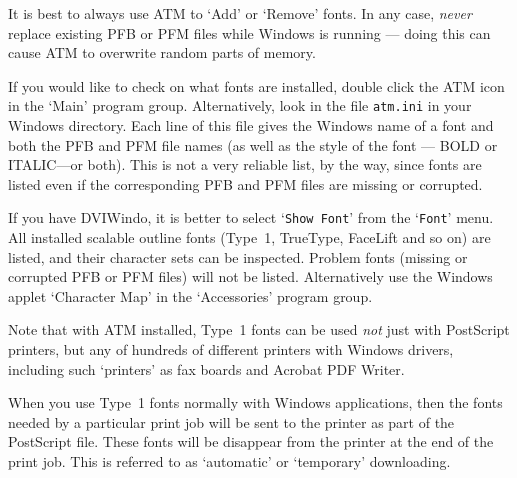 It is best to always use ATM to `Add' or `Remove' fonts.
%
In any case, {\it never} replace existing PFB or PFM files while Windows is
running --- doing this can cause ATM to overwrite random parts of memory.
%

If you would like to check on what fonts are installed, double
click the ATM icon in the `Main' program group.
Alternatively, look in the file {\tt atm.ini} in your Windows directory.
Each line of this file gives the Windows name of a
font and both the PFB and PFM file names (as well as the style of the font
--- BOLD or ITALIC---or both).  
This is not a very reliable list, by the way, since fonts are listed even if
the corresponding PFB and PFM files are missing or corrupted.

If you have DVI\-Windo, it is better to select
`{\tt Show Font}' from the `{\tt Font}' menu.  
All installed scalable outline fonts 
(Type~1, TrueType, FaceLift and so on) are listed, 
and their character sets can be inspected. 
Problem fonts (missing or %
corrupted PFB or PFM files) will not be listed. 
Alternatively use the Windows applet `Character Map' in the `Accessories'
program group.

Note that with ATM installed, Type~1 fonts can be used {\it not\/} just with
PostScript printers, but any of hundreds of different printers with Windows
drivers, including such `printers' as fax boards and %
Acrobat PDF Writer.


	
When you use Type~1 fonts normally with Windows applications, 
then the fonts needed by a particular print job
will be sent to the printer as part of the PostScript file.
These fonts will be  %
disappear from the printer at the end of the print job.  
This is referred to as `automatic' or `temporary' downloading.

